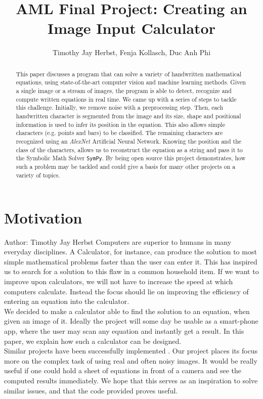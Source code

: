 \documentclass[11pt]{article}
\title{AML Final Project: Creating an Image Input Calculator} %
\author{Timothy Jay Herbst, Fenja Kollasch, Duc Anh Phi}
\begin{document}
	\maketitle
	
	\begin{abstract}
		This paper discusses a program that can solve a variety of handwritten mathematical equations, using state-of-the-art computer vision and machine learning methods.
		Given a single image or a stream of images, the program is able to detect, recognize and compute written equations in real time.
		We came up with a series of steps to tackle this challenge.
		Initially, we remove noise with a preprocessing step.
		Then, each handwritten character is segmented from the image and its size, shape and positional information is used to infer its position in the equation.
		This also allows simple characters (e.g. points and bars) to be classified.
		The remaining characters are recognized using an \textit{AlexNet} Artificial Neural Network.
		Knowing the position and the class of the characters, allows us to reconstruct the equation as a string and pass it to the Symbolic Math Solver \texttt{SymPy}.
		By being open source this project demonstrates, how such a problem may be tackled and could give a basis for many other projects on a variety of topics.
		
		
		
	\end{abstract}
	\newpage
	
	\tableofcontents
	
	\newpage
	\section{Motivation}
	\small{Author: Timothy Jay Herbst} \newline \newline
	Computers are superior to humans in many everyday disciplines.
	A Calculator, for instance, can produce the solution to most simple mathematical problems faster than the user can enter it.
	This has inspired us to search for a solution to this flaw in a common household item.
	If we want to improve upon calculators, we will not have to increase the speed at which computers calculate.
	Instead the focus should lie on improving the efficiency of entering an equation into the calculator.\\
	We decided to make a calculator able to find the solution to an equation, when given an image of it.
	Ideally the project will some day be usable as a smart-phone app, where the user may scan any equation and instantly get a result.
	In this paper, we explain how such a calculator can be designed.\\ Similar projects have been successfully implemented \cite{inspired-blog}. Our project places its focus more on the complex task of using real and often noisy images. It would be really useful if one could hold a sheet of equations in front of a camera and see the computed results immediately.
	We hope that this serves as an inspiration to solve similar issues, and that the code provided proves useful.
	
\end{document}
